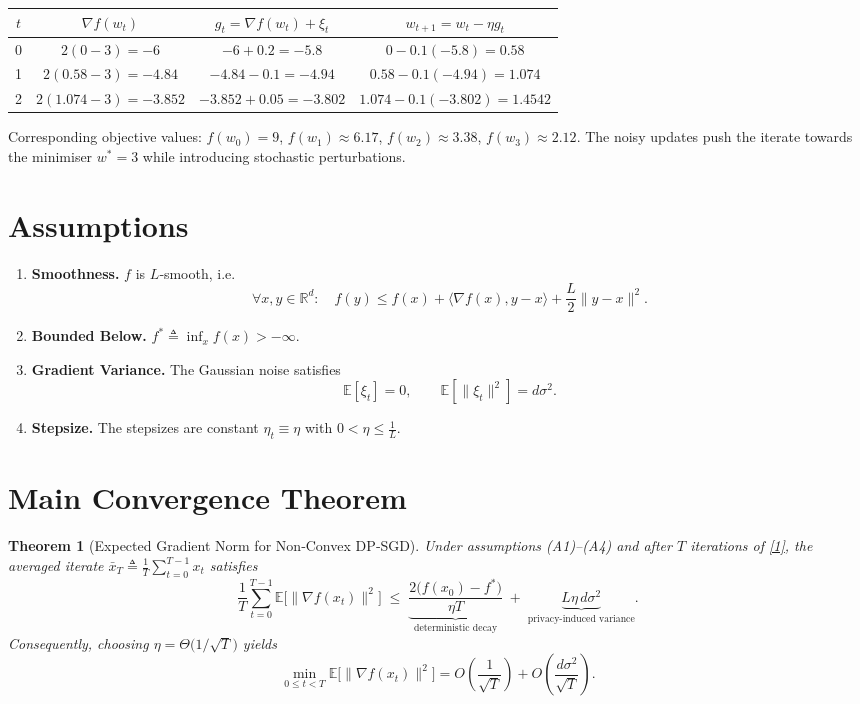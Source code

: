 \documentclass{article}
\newtheorem{theorem}{Theorem}
\newcommand{\E}{\mathbb{E}}
\newcommand{\R}{\mathbb{R}}
\begin{document}
\begin{center}
\begin{tabular}{c|c|c|c}
$t$ & $\nabla f(w_{t})$ & $g_{t}= \nabla f(w_{t})+\xi_{t}$ & $w_{t+1}=w_{t}-\eta g_{t}$ \\ \hline
0 & $2(0-3)=-6$ & $-6+0.2=-5.8$ & $0-0.1(-5.8)=0.58$ \\[4pt]
1 & $2(0.58-3)=-4.84$ & $-4.84-0.1=-4.94$ & $0.58-0.1(-4.94)=1.074$ \\[4pt]
2 & $2(1.074-3)=-3.852$ & $-3.852+0.05=-3.802$ & $1.074-0.1(-3.802)=1.4542$
\end{tabular}
\end{center}
Corresponding objective values:
$f(w_{0})=9$, $f(w_{1})\approx6.17$, $f(w_{2})\approx3.38$, $f(w_{3})\approx2.12$.
The noisy updates push the iterate towards the minimiser $w^{*}=3$ while
introducing stochastic perturbations.

\newpage
\section*{Assumptions}
\begin{enumerate}
\item \textbf{Smoothness.} $f$ is $L$‑smooth, i.e.
\[
\forall x,y\in\R^{d}:\quad
f(y)\le f(x)+\langle\nabla f(x),y-x\rangle+\frac{L}{2}\|y-x\|^{2}.
\tag{A1}
\]
\item \textbf{Bounded Below.} $f^{*}\triangleq\inf_{x}f(x)>-\infty$.
\item \textbf{Gradient Variance.} The Gaussian noise satisfies
\[
\E[\xi_{t}]=0,\qquad \E[\|\xi_{t}\|^{2}]=d\sigma^{2}.
\tag{A2}
\]
\item \textbf{Stepsize.} The stepsizes are constant $\eta_{t}\equiv\eta$ with
$0<\eta\le\frac{1}{L}$.
\end{enumerate}

\section*{Main Convergence Theorem}
\begin{theorem}[Expected Gradient Norm for Non‑Convex DP‑SGD]\label{thm:main}
Under assumptions (A1)–(A4) and after $T$ iterations of \eqref{1},
the averaged iterate $\bar x_{T}\triangleq\frac{1}{T}\sum_{t=0}^{T-1}x_{t}$ satisfies
\[
\frac{1}{T}\sum_{t=0}^{T-1}\E\!\bigl[\|\nabla f(x_{t})\|^{2}\bigr]\;
\le\;
\underbrace{\frac{2\bigl(f(x_{0})-f^{*}\bigr)}{\eta T}}_{\text{deterministic decay}}
\;+\;
\underbrace{L\eta\,d\sigma^{2}}_{\text{privacy‑induced variance}}.
\tag{2}
\]
Consequently, choosing $\eta=\Theta\!\bigl(1/\sqrt{T}\bigr)$ yields
\[
\min_{0\le t<T}\E\!\bigl[\|\nabla f(x_{t})\|^{2}\bigr]
=O\!\left(\frac{1}{\sqrt{T}}\right)+O\!\left(\frac{d\sigma^{2}}{\sqrt{T}}\right).
\]
\end{theorem}
\end{document}
